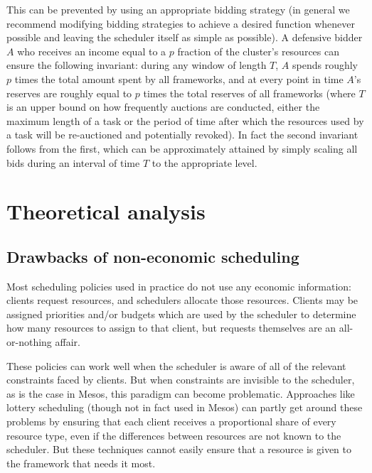 \documentclass{acm_proc_article-sp}
\begin{document}
This can be prevented by using an appropriate bidding strategy
(in general we recommend modifying bidding strategies to achieve a desired
function whenever possible and leaving the scheduler itself as simple as possible).
A defensive bidder $A$ who receives an income equal to a $p$ fraction
of the cluster's resources can ensure the following invariant:
during any window of length $T$, $A$ spends roughly $p$ times the total amount
spent by all frameworks, and at every point in time $A$'s reserves are roughly equal to $p$
times the total reserves of all frameworks (where $T$ is an upper bound on how frequently auctions are conducted,
either the maximum length of a task or the period of time after which the resources used by a task
will be re-auctioned and potentially revoked).
In fact the second invariant follows from the first, which can be approximately attained
by simply scaling all bids during an interval of time $T$ to the appropriate level.

\section{Theoretical analysis}
\label{sec:theory}

\subsection{Drawbacks of non-economic scheduling}\label{drawbacks}
Most scheduling policies used in practice do not use any economic information: clients request resources, and schedulers allocate those resources. Clients may be assigned priorities and/or budgets which are used by the scheduler to determine how many resources to assign to that client, but requests themselves are an all-or-nothing affair.

These policies can work well when the scheduler is aware of all of the relevant constraints faced by clients. But when constraints are invisible to the scheduler, as is the case in Mesos, this paradigm can become problematic. Approaches like lottery scheduling (though not in fact used in Mesos) can partly get around these problems by ensuring that each client receives a proportional share of every resource type, even if the differences between resources are not known to the scheduler. But these techniques cannot easily ensure that a resource is given to the framework that needs it most.
\end{document}

